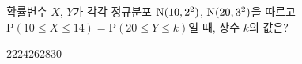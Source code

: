 확률변수 $X$, $Y$가 각각 정규분포 $\mathrm{N}(10{,}\mkern3mu\mathopen{}2^2)$, $\mathrm{N}(20{,}\mkern3mu\mathopen{}3^2)$을 따르고 $\mathrm{P}(10\le X\le 14)=\mathrm{P}(20\le Y\le k)$일 때, 상수 $k$의 값은?
\begin{choices32}{$22$}{$24$}{$26$}{$28$}{$30$}\end{choices32}

